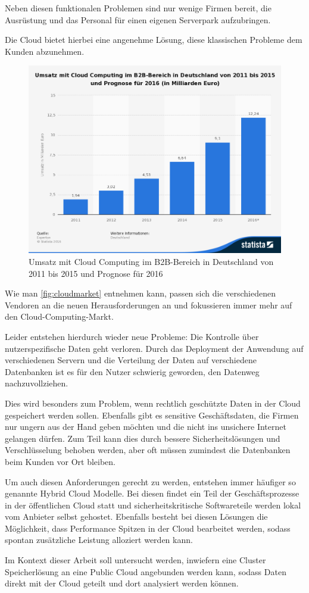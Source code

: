 Neben diesen funktionalen Problemen sind nur wenige Firmen bereit, die Ausrüstung und das Personal für einen eigenen Serverpark aufzubringen.

Die Cloud bietet hierbei eine angenehme Lösung, diese klassischen Probleme dem Kunden abzunehmen.

\begin{figure}[hbt]
	\centering
	\includegraphics[scale=0.5]{images/cloud-computing-market}
	\caption{Umsatz mit Cloud Computing im B2B-Bereich in Deutschland von 2011 bis 2015 und Prognose für 2016 \parencite{statistia.2015}}
	\label{fig:cloudmarket}
\end{figure}

Wie man \autoref{fig:cloudmarket} entnehmen kann, passen sich die verschiedenen Vendoren an die neuen Herausforderungen an und fokussieren immer mehr auf den Cloud-Computing-Markt.

Leider entstehen hierdurch wieder neue Probleme: Die Kontrolle über nutzerspezifische Daten geht verloren. Durch das Deployment der Anwendung auf verschiedenen Servern und die Verteilung der Daten auf verschiedene Datenbanken ist es für den Nutzer schwierig geworden, den Datenweg nachzuvollziehen.

Dies wird besonders zum Problem, wenn rechtlich geschützte Daten in der Cloud gespeichert werden sollen. Ebenfalls gibt es sensitive Geschäftsdaten, die Firmen nur ungern aus der Hand geben möchten und die nicht ins unsichere Internet gelangen dürfen.
Zum Teil kann dies durch bessere Sicherheitslösungen und Verschlüsselung behoben werden, aber oft müssen zumindest die Datenbanken beim Kunden vor Ort bleiben. 

Um auch diesen Anforderungen gerecht zu werden, entstehen immer häufiger so genannte Hybrid Cloud Modelle. Bei diesen findet ein Teil der Geschäftsprozesse in der öffentlichen Cloud statt und sicherheitskritische Softwareteile werden lokal vom Anbieter selbst gehostet. Ebenfalls besteht bei diesen Lösungen die Möglichkeit, dass Performance Spitzen in der Cloud bearbeitet werden, sodass spontan zusätzliche Leistung alloziert werden kann.

Im Kontext dieser Arbeit soll untersucht werden, inwiefern eine Cluster Speicherlösung an eine Public Cloud angebunden werden kann, sodass Daten direkt mit der Cloud geteilt und dort analysiert werden können. 